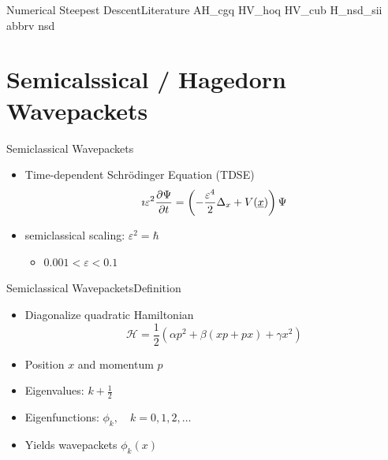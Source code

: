 \documentclass{beamer}
\begin{document}
\begin{frame}{Numerical Steepest Descent}{Literature}
  \nocite{nsd}{AH_cgq}
  \nocite{nsd}{HV_hoq}
  \nocite{nsd}{HV_cub}
  \nocite{nsd}{H_nsd_sii}
  \scriptsize
  {abbrv}
  {nsd}{}
\end{frame}


\section{Semicalssical / Hagedorn Wavepackets}


\begin{frame}{Semiclassical Wavepackets}
  \begin{itemize}
    \item Time-dependent Schr\"odinger Equation (TDSE)
    \begin{equation*}
      \imath \varepsilon^2 \frac{\partial \Psi}{\partial t} = \left(-\frac{\varepsilon^4}{2}\Delta_x + V(\underline{x})\right) \Psi
    \end{equation*}
    \vspace{0.5cm}
    \item semiclassical scaling: $\varepsilon^2 = \hbar$
    \begin{itemize}
      \item $0.001 < \varepsilon < 0.1$
    \end{itemize}
  \end{itemize}
\end{frame}


\begin{frame}{Semiclassical Wavepackets}{Definition}
  \begin{itemize}
    \item Diagonalize quadratic Hamiltonian
      \begin{equation*}
        \mathcal{H} = \frac{1}{2} \left(\alpha p^2 + \beta (x p + p x) + \gamma x^2\right)
      \end{equation*}
    \item Position $x$ and momentum $p$
    \item Eigenvalues: $k + \frac{1}{2}$
    \item Eigenfunctions: $\phi_k, \quad k = 0, 1, 2, \ldots$
    \item Yields wavepackets $\phi_k(x)$
  \end{itemize}
\end{frame}
\end{document}
